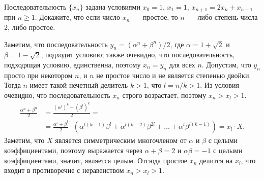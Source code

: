 \problem
Последовательность $\{ x_n \}$ задана условиями
$x_0 = 1$, $x_1 = 1$, $x_{n + 1} = 2 x_{n} + x_{n - 1}$ при $n \geq 1$.
Докажите, что если число $x_n$~--- простое, то $n$~--- либо степень числа 2,
либо простое.

\solution
Заметим, что последовательность
$y_n = (\alpha^n + \beta^n)/2$,
где $\alpha = 1 + \sqrt{2}$ и $\beta = 1 - \sqrt{2}$,
подходит условию;
также очевидно, что последовательность, подходящая условию, единственна,
поэтому $x_n = y_n$ для всех $n$.
Допустим, что $y_n$ просто при некотором $n$, и $n$ не простое число и не
является степенью двойки.
Тогда $n$ имеет такой нечетный делитель $k > 1$, что $l = n / k > 1$.
Из условия очевидно, что последовательность $x_n$ строго возрастает, поэтому
$x_n > x_l > 1$.
\begin{align*}
    \frac{\alpha^n + \beta^n}{2}
&{}=
    \frac{(\alpha^l)^k + (\beta^l)^k}{2}
=\\&{}=
    \frac{\alpha^l + \beta^l}{2}
    \cdot
    \left(
        \alpha^{l (k - 1)} \beta^l
        +
        \alpha^{l (k - 2)} \beta^{2 l}
        + \ldots +
        \alpha^l \beta^{l (k - 1)}
    \right)
=
    x_l \cdot X
.\end{align*}
Заметим, что $X$ является симметрическим многочленом от $\alpha$ и $\beta$ с
целыми коэффициентами,
поэтому выражается через $\alpha + \beta = 2$ и $\alpha \beta = -1$
с целыми коэффициентами, значит, является целым.
Отсюда простое $x_n$ делится на $x_l$, что входит в противоречие с
неравенством $x_n > x_l > 1$.

\endproblem
